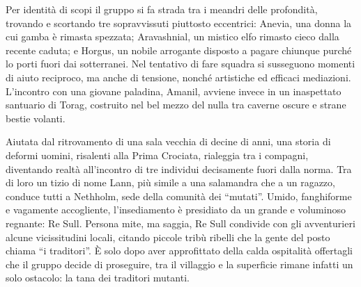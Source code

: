 Per identit\`a di scopi il gruppo si fa strada tra i meandri delle profondit\`a, trovando e scortando tre sopravvissuti piuttosto eccentrici: Anevia, una donna la cui gamba \`e rimasta spezzata; Aravashnial, un mistico elfo rimasto cieco dalla recente caduta; e Horgus, un nobile arrogante disposto a pagare chiunque purch\'e lo porti fuori dai sotterranei. Nel tentativo di fare squadra si susseguono momenti di aiuto reciproco, ma anche di tensione, nonch\'e artistiche ed efficaci mediazioni. L'incontro con una giovane paladina, Amanil, avviene invece in un inaspettato santuario di Torag, costruito nel bel mezzo del nulla tra caverne oscure e strane bestie volanti.

Aiutata dal ritrovamento di una sala vecchia di decine di anni, una storia di deformi uomini, risalenti alla Prima Crociata, rialeggia tra i compagni, diventando realt\`a all'incontro di tre individui decisamente fuori dalla norma. Tra di loro un tizio di nome Lann, pi\`u simile a una salamandra che a un ragazzo, conduce tutti a Nethholm, sede della comunit\`a dei ``mutati''. Umido, fanghiforme e vagamente accogliente, l'insediamento \`e presidiato da un grande e voluminoso regnante: Re Sull. Persona mite, ma saggia, Re Sull condivide con gli avventurieri alcune vicissitudini locali, citando piccole trib\`u ribelli che la gente del posto chiama ``i traditori''. \`E solo dopo aver approfittato della calda ospitalit\`a offertagli che il gruppo decide di proseguire, tra il villaggio e la superficie rimane infatti un solo ostacolo: la tana dei traditori mutanti.